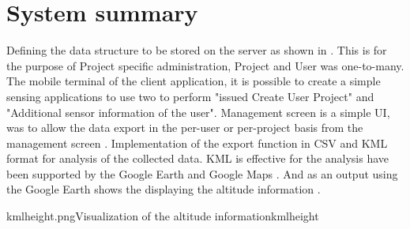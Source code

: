 \section{System summary}
Defining the data structure to be stored on the server as shown in . This is for the purpose of Project specific administration, Project and User was one-to-many.
The mobile terminal of the client application, it is possible to create a simple sensing applications to use two to perform "issued Create User Project" and "Additional sensor information of the user".
Management screen is a simple UI, was to allow the data export in the per-user or per-project basis from the management screen  . Implementation of the export function in CSV and KML format for analysis of the collected data. KML is effective for the analysis have been supported by the Google Earth and Google Maps . And as an output using the Google Earth shows the displaying the altitude information .


\vspace{-1cm}

{kmlheight.png}{Visualization of the altitude information}{kmlheight}


\newpage
